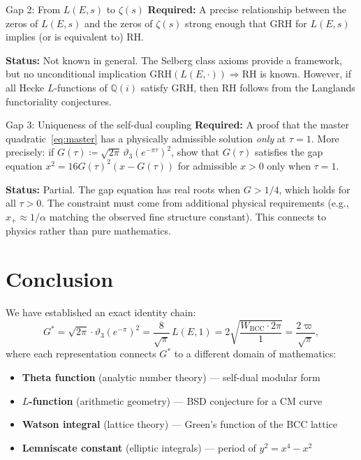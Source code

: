 \documentclass[11pt]{article}
\theoremstyle{tight}
\theoremstyle{plainroman}
\newcommand{\Q}{\mathbb{Q}}
\begin{document}
\begin{statusbox}{Gap 2: From $L(E,s)$ to $\zeta(s)$}
\textbf{Required:} A precise relationship between the zeros of $L(E,s)$ and the zeros of $\zeta(s)$ strong enough that GRH for $L(E,s)$ implies (or is equivalent to) RH.

\textbf{Status:} Not known in general.
The Selberg class axioms provide a framework, but no unconditional implication $\mathrm{GRH}(L(E,\cdot))\Rightarrow\mathrm{RH}$ is known.
However, if all Hecke $L$-functions of $\Q(i)$ satisfy GRH, then RH follows from the Langlands functoriality conjectures.
\end{statusbox}

\begin{statusbox}{Gap 3: Uniqueness of the self-dual coupling}
\textbf{Required:} A proof that the master quadratic~\eqref{eq:master} has a physically admissible solution \emph{only} at $\tau=1$.
More precisely: if $G(\tau)\coloneqq\sqrt{2\pi}\,\vartheta_3(e^{-\pi\tau})^2$, show that $G(\tau)$ satisfies the gap equation $x^2=16G(\tau)^2(x-G(\tau))$ for admissible $x>0$ only when $\tau=1$.

\textbf{Status:} Partial.
The gap equation has real roots when $G>1/4$, which holds for all $\tau>0$.
The constraint must come from additional physical requirements (e.g., $x_+\approx 1/\alpha$ matching the observed fine structure constant).
This connects to physics rather than pure mathematics.
\end{statusbox}

\section{Conclusion}

We have established an exact identity chain:
\[
G^*=\sqrt{2\pi}\cdot\vartheta_3(e^{-\pi})^2=\frac{8}{\sqrt{\pi}}\,L(E,1)=2\sqrt{\frac{W_{\mathrm{BCC}}\cdot 2\pi}{1}}=\frac{2\varpi}{\sqrt{\pi}},
\]
where each representation connects $G^*$ to a different domain of mathematics:
\begin{itemize}[nosep]
\item \textbf{Theta function} (analytic number theory) --- self-dual modular form
\item \textbf{$L$-function} (arithmetic geometry) --- BSD conjecture for a CM curve
\item \textbf{Watson integral} (lattice theory) --- Green's function of the BCC lattice
\item \textbf{Lemniscate constant} (elliptic integrals) --- period of $y^2=x^4-x^2$
\end{itemize}
\end{document}
